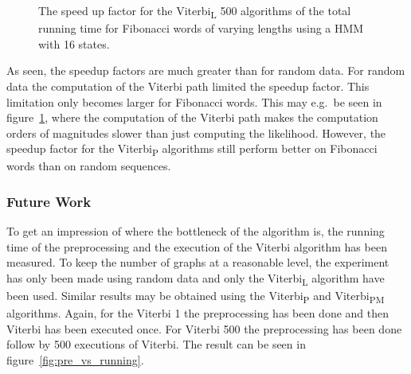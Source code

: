 \begin{figure}
  \centering
  
  \caption{The speed up factor for the Viterbi\textsubscript{L} 500 algorithms of the total
    running time for Fibonacci words of varying
    lengths using a HMM with 16 states.}
  \label{fig:fib_compressed_500_speedup_vs_sequence_length}
\end{figure}

As seen, the speedup factors are much greater than for random data. For random
data the computation of the Viterbi path limited the speedup factor. This
limitation only becomes larger for Fibonacci words. This may e.g.\ be seen
in figure~\ref{fig:fib_compressed_500_speedup_vs_sequence_length}, where the
computation of the Viterbi path makes the computation orders of magnitudes
slower than just computing the likelihood. However, the speedup factor for the
Viterbi\textsubscript{P} algorithms still perform better on Fibonacci words than on
random sequences.

\subsubsection{Future Work}

To get an impression of where the bottleneck of the algorithm is, the running
time of the preprocessing and the execution of the Viterbi algorithm has been
measured. To keep the number of graphs at a reasonable level, the experiment
has only been made using random data and only the Viterbi\textsubscript{L}
algorithm have been used. Similar results may be obtained using the
Viterbi\textsubscript{P} and Viterbi\textsubscript{PM} algorithms. Again, for
the Viterbi 1 the preprocessing has been done and then Viterbi has been
executed once. For Viterbi 500 the preprocessing has been done follow by 500
executions of Viterbi. The result can be seen in
figure~\ref{fig:pre_vs_running}.

